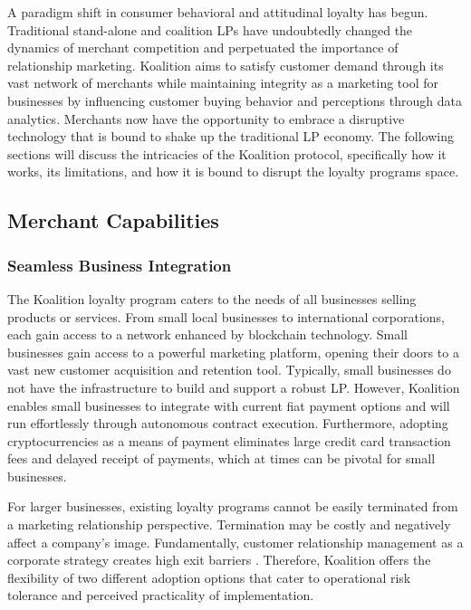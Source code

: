 A paradigm shift in consumer behavioral and attitudinal loyalty has begun. Traditional stand-alone and coalition LPs have undoubtedly changed the dynamics of merchant competition and perpetuated the importance of relationship marketing. Koalition aims to satisfy customer demand through its vast network of merchants while maintaining integrity as a marketing tool for businesses by influencing customer buying behavior and perceptions through data analytics. Merchants now have the opportunity to embrace a disruptive technology that is bound to shake up the traditional LP economy. The following sections will discuss the intricacies of the Koalition protocol, specifically how it works, its limitations, and how it is bound to disrupt the loyalty programs space.

\subsection{Merchant Capabilities}

\subsubsection{Seamless Business Integration}
The Koalition loyalty program caters to the needs of all businesses selling products or services. From small local businesses to international corporations, each gain access to a network enhanced by blockchain technology. Small businesses gain access to a powerful marketing platform, opening their doors to a vast new customer acquisition and retention tool. Typically, small businesses do not have the infrastructure to build and support a robust LP. However, Koalition enables small businesses to integrate with current fiat payment options and will run effortlessly through autonomous contract execution. Furthermore, adopting cryptocurrencies as a means of payment eliminates large credit card transaction fees and delayed receipt of payments, which at times can be pivotal for small businesses.

For larger businesses, existing loyalty programs cannot be easily terminated from a marketing relationship perspective. Termination may be costly and negatively affect a company's image. Fundamentally, customer relationship management as a corporate strategy creates high exit barriers \cite{Rehnen16}. Therefore, Koalition offers the flexibility of two different adoption options that cater to operational risk tolerance and perceived practicality of implementation.  


